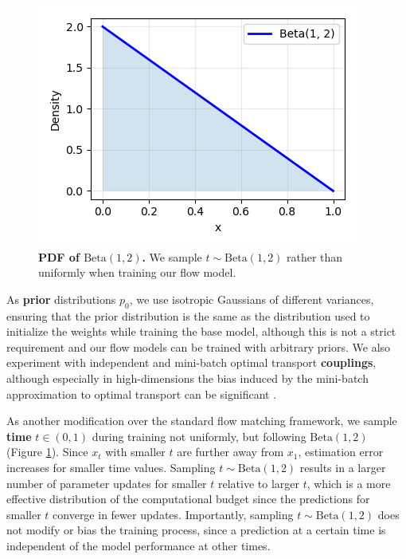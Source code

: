 \begin{figure}
    \centering
        \includegraphics[width=\linewidth]{figures/beta.png}
    \caption{\label{fig:beta}\textbf{PDF of $\text{Beta}(1,2)$.} We sample $t\sim \text{Beta}(1,2)$ rather than uniformly when training our flow model.}
\end{figure}


As \textbf{prior} distributions $p_0$, we use isotropic Gaussians of different variances, ensuring that the prior distribution is the same as the distribution used to initialize the weights while training the base model, although this is not a strict requirement and our flow models can be trained with arbitrary priors. We also experiment with independent and mini-batch optimal transport \textbf{couplings}, although especially in high-dimensions the bias induced by the mini-batch approximation to optimal transport can be significant \citep{fatrasMinibatchOptimalTransport2021}. 

As another modification over the standard flow matching framework, we sample \textbf{time} $t \in (0,1)$  during training not uniformly, but following $\text{Beta}(1,2)$ (Figure \ref{fig:beta}). Since $x_t$ with smaller $t$ are further away from $x_1$, estimation error increases for smaller time values. Sampling $t \sim \text{Beta}(1,2)$ results in a larger number of parameter updates for smaller $t$ relative to larger $t$, which is a more effective distribution of the computational budget since the predictions for smaller $t$ converge in fewer updates. Importantly, sampling $t \sim \text{Beta}(1,2)$ does not modify or bias the training process, since a prediction at a certain time is independent of the model performance at other times. 

